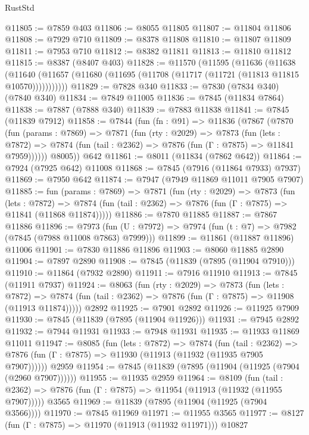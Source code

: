 \begin{lexlean}{RustStd}
\begin{coremodule}
@11805 := @7859 @403
@11806 := @8055 @11805
@11807 := @11804 @11806
@11808 := @7929 @710
@11809 := @8378 @11808
@11810 := @11807 @11809
@11811 := @7953 @710
@11812 := @8382 @11811
@11813 := @11810 @11812
@11815 := @8387 (@8407 @403)
@11828 := @11570
    (@11595
      (@11636
        (@11638
          (@11640 (@11657 (@11680 (@11695 (@11708 (@11717 (@11721 (@11813 @11815 @10570)))))))))))
@11829 := @7828 @340
@11833 := @7830 (@7834 @340) (@7840 @340)
@11834 := @7849 @11005
@11836 := @7845 (@11834 @7864)
@11838 := @7887 (@7888 @340)
@11839 := @7883 @11838
@11841 := @7845 (@11839 @7912)
@11858 := @7844
    (fun (fn : @91) =>
    @11836
      (@7867
        (@7870
          (fun (params : @7869) =>
          @7871
            (fun (rty : @2029) =>
            @7873
              (fun (lets : @7872) =>
              @7874 (fun (tail : @2362) => @7876 (fun (Γ : @7875) => @11841 @7959))))))
        @8005))
    @642
@11861 := @8011 (@11834 (@7862 @642))
@11864 := @7924 (@7925 @642) @11008
@11868 := @7845 (@7916 (@11864 @7933) @7937)
@11869 := @7950 @642
@11874 := @7947 (@7949 @11869 @11011 @7905 @7907)
@11885 := fun (params : @7869) =>
  @7871
    (fun (rty : @2029) =>
    @7873
      (fun (lets : @7872) =>
      @7874 (fun (tail : @2362) => @7876 (fun (Γ : @7875) => @11841 (@11868 @11874)))))
@11886 := @7870 @11885
@11887 := @7867 @11886
@11896 := @7973
    (fun (U : @7972) => @7974 (fun (t : @7) => @7982 (@7845 (@7988 @11008 @7863) @7999)))
@11899 := @11861 (@11887 @11896) @11006
@11901 := @7830 @11886 @11896
@11903 := @8060 @11885 @2890
@11904 := @7897 @2890
@11908 := @7845 (@11839 (@7895 (@11904 @7910)))
@11910 := @11864 (@7932 @2890)
@11911 := @7916 @11910
@11913 := @7845 (@11911 @7937)
@11924 := @8063
    (fun (rty : @2029) =>
    @7873
      (fun (lets : @7872) =>
      @7874 (fun (tail : @2362) => @7876 (fun (Γ : @7875) => @11908 (@11913 @11874)))))
    @2892
@11925 := @7901 @2892
@11926 := @11925 @7909
@11930 := @7845 (@11839 (@7895 (@11904 @11926)))
@11931 := @7945 @2892
@11932 := @7944 @11931
@11933 := @7948 @11931
@11935 := @11933 @11869 @11011
@11947 := @8085
    (fun (lets : @7872) =>
    @7874
      (fun (tail : @2362) =>
      @7876 (fun (Γ : @7875) => @11930 (@11913 (@11932 (@11935 @7905 @7907))))))
    @2959
@11954 := @7845 (@11839 (@7895 (@11904 (@11925 (@7904 (@2960 @7907))))))
@11955 := @11935 @2959
@11964 := @8109
    (fun (tail : @2362) => @7876 (fun (Γ : @7875) => @11954 (@11913 (@11932 (@11955 @7907)))))
    @3565
@11969 := @11839 (@7895 (@11904 (@11925 (@7904 @3566))))
@11970 := @7845 @11969
@11971 := @11955 @3565
@11977 := @8127 (fun (Γ : @7875) => @11970 (@11913 (@11932 @11971))) @10827

\end{coremodule}
\end{lexlean}
